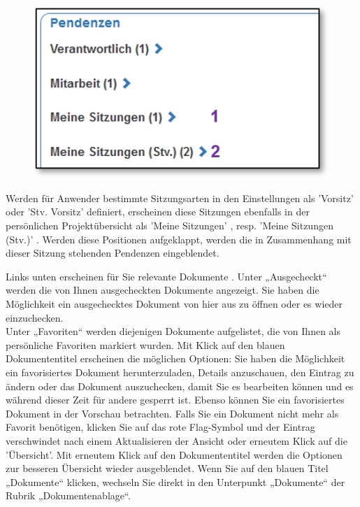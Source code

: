 \begin{figure}   %
  \vspace{-15pt}      %
  \begin{center}
    \includegraphics[width=1\linewidth]{../chapters/01_Einfuehrung/pictures/Sitzungsart_Zuweisung.jpg}
  \end{center}
  \vspace{-20pt}
  \vspace{-10pt}
\end{figure}

Werden für Anwender bestimmte Sitzungsarten in den Einstellungen als 'Vorsitz' oder 'Stv. Vorsitz' definiert, erscheinen diese Sitzungen ebenfalls in der persönlichen Projektübersicht als 'Meine Sitzungen' , resp. 'Meine Sitzungen (Stv.)' . Werden diese Positionen aufgeklappt, werden die in Zusammenhang mit dieser Sitzung stehenden Pendenzen eingeblendet.

\vspace{\baselineskip}

Links unten erscheinen für Sie relevante Dokumente . Unter „Ausgecheckt“ werden die von Ihnen ausgecheckten Dokumente angezeigt. Sie haben die Möglichkeit ein ausgechecktes Dokument von hier aus zu öffnen oder es wieder einzuchecken. \\

Unter „Favoriten“ werden diejenigen Dokumente aufgelistet, die von Ihnen als persönliche Favoriten markiert wurden. Mit Klick auf den blauen Dokumententitel erscheinen die möglichen Optionen: Sie haben die Möglichkeit ein favorisiertes Dokument herunterzuladen, Details anzuschauen, den Eintrag zu ändern oder das Dokument auszuchecken, damit Sie es bearbeiten können und es während dieser Zeit für andere gesperrt ist. Ebenso können Sie ein favorisiertes Dokument in der Vorschau betrachten. Falls Sie ein Dokument nicht mehr als Favorit benötigen, klicken Sie auf das rote Flag-Symbol und der Eintrag verschwindet nach einem Aktualisieren der Ansicht oder erneutem Klick auf die 'Übersicht'. Mit erneutem Klick auf den Dokumententitel werden die Optionen zur besseren Übersicht wieder ausgeblendet. Wenn Sie auf den blauen Titel „Dokumente“  klicken, wechseln Sie direkt in den Unterpunkt „Dokumente“ der Rubrik „Dokumentenablage“.


